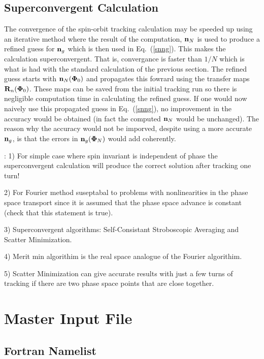 \documentclass[11pt,openany]{report}
\newcommand{\Bf}[1]{{\bf #1}}
\newcommand{\bfn}{{\Bf n}}
\newcommand{\bfR}{{\Bf R}}
\newcommand{\bfPhi}{{\Bf \Phi}}
\newcommand{\Eq}[1]{{Eq.~(\protect\ref{#1})}}
\begin{document}
\section{Superconvergent Calculation}

The convergence of the spin-orbit tracking calculation may be speeded up using an iterative method
where the result of the computation, $\bfn_N$ is used to produce a refined guess for $\bfn_g$ which
is then used in \Eq{snng}. This makes the calculation superconvergent. That is, convergance is
faster than $1/N$ which is what is had with the standard calculation of the previous section. The
refined guess starts with $\bfn_N(\bfPhi_0)$ and propagates this fowrard using the transfer maps
$\bfR_n(\bfPhi_0)$. These maps can be saved from the initial tracking run so there is negligible
computation time in calculating the refined guess. If one would now naively use this propagated
guess in \Eq{snng}, no improvement in the accuracy would be obtained (in fact the computed $\bfn_N$
would be unchanged). The reason why the accuracy would not be imporved, despite using a more
accurate $\bfn_g$, is that the errors in $\bfn_g(\bfPhi_N)$ would add coherently. 



\Notes:
1) For simple case where spin invariant is independent of phase the superconvergent calculation will produce the
correct solution after tracking one turn!

2) For Fourier method suseptabal to problems with nonlinearities in the phase space transport since it is assumed
that the phase space advance is constant (check that this statement is true).

3) Superconvergent algorithms: Self-Consistant Stroboscopic Averaging and Scatter Minimization.

4) Merit min algorithim is the real space analogue of the Fourier algorithim.

5) Scatter Minimization can give accurate results with just a few turns of tracking if there are two phase
space points that are close together.

\chapter{Master Input File} 
\label{s:master}

\section{Fortran Namelist}
\label{s:namelist}
\end{document}
